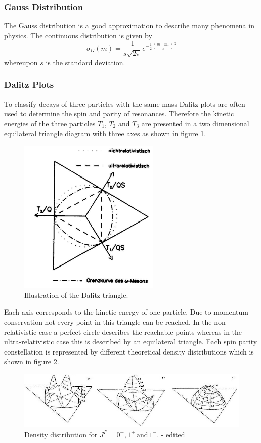 \documentclass[10pt, a4paper, notitlepage, DIV=15]{scrartcl}
\begin{document}
\subsubsection{Gauss Distribution}
The Gauss distribution is a good approximation to describe many phenomena in physics. The continuous distribution is given by \cite{gauss}
\begin{equation}
	\sigma_G(m)=\frac{1}{s\sqrt{2\pi}}e^{-\frac{1}{2}\left( \frac{m-m_\omega}{s}\right)^2} 
\end{equation} 
whereupon $s$ is the standard deviation. 
\subsubsection{Dalitz Plots}
To classify decays of three particles with the same mass Dalitz plots are often used to determine the spin and parity of resonances. Therefore the kinetic energies of the three particles $T_1$, $T_2$ and $T_3$ are presented in a two dimensional equilateral triangle diagram with three axes as shown in figure \ref{fig:dalitz}.
\begin{figure}[h]
	\centering
	\includegraphics[width=0.6\textwidth]{Dalitz-triangle}
	\caption{Illustration of the Dalitz triangle. \cite{description}}
	\label{fig:dalitz}
\end{figure}
Each axis corresponds to the kinetic energy of one particle. Due to momentum conservation not every point in this triangle can be reached. In the non-relativistic case a perfect circle describes the reachable points whereas in the ultra-relativistic case this is described by an equilateral triangle. Each spin parity constellation is represented by different theoretical density distributions which is shown in figure \ref{fig:density_theo}.
\begin{figure}[h]
	\centering
	\includegraphics[width=1\textwidth]{density_theo}
	\caption{Density distribution for $J^P=0^-, 1^+ \,\text{and}\, 1^-$. \cite{description} - edited}
	\label{fig:density_theo}
\end{figure}
\end{document}
